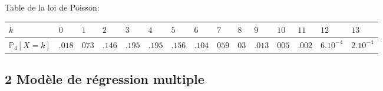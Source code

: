 \documentclass[a4paper,10pt]{article}
\begin{document}
Table de la loi de Poisson:
\begin{center}
\begin{tabular}{|l|l|l|l|l|l|l|l|l|l|l|l|l|l|l|}
\hline
\multicolumn{1}{|l|}{$k$}&	\multicolumn{1}{|l|}{ $0$}&	\multicolumn{1}{|l|}{ $1$}&	\multicolumn{1}{|l|}{ $2$}&	\multicolumn{1}{|l|}{ $3$}&	\multicolumn{1}{|l|}{ $4$}&	\multicolumn{1}{|l|}{ $5$}&	\multicolumn{1}{|l|}{ $6$}&	\multicolumn{1}{|l|}{ $7$}&	\multicolumn{1}{|l|}{ $8$}&	\multicolumn{1}{|l|}{ $9$}&	\multicolumn{1}{|l|}{ $10$}&	\multicolumn{1}{|l|}{ $11$}&	\multicolumn{1}{|l|}{ $12$}&	\multicolumn{1}{|l|}{ $13$}	\\
\hline
\multicolumn{1}{|l|}{ $\mathbb{P}_{4}[X=k]$}&	\multicolumn{1}{|l|}{ $.018$}&	\multicolumn{1}{|l|}{ $073$}&	\multicolumn{1}{|l|}{ $.146$}&	\multicolumn{1}{|l|}{ $.195$}&	\multicolumn{1}{|l|}{ $.195$}&	\multicolumn{1}{|l|}{ $.156$}&	\multicolumn{1}{|l|}{ $.104$}&	\multicolumn{1}{|l|}{ $059$}&	\multicolumn{1}{|l|}{ $03$}&	\multicolumn{1}{|l|}{ $.013$}&	\multicolumn{1}{|l|}{ $005$}&	\multicolumn{1}{|l|}{ $.002$}&	\multicolumn{1}{|l|}{ $6.10^{-4}$}&	\multicolumn{1}{|l|}{ $2.10^{-4}$}	\\
\hline
\end{tabular}

\end{center}
\subsection*{2 Mod\`{e}le de r\'{e}gression multiple}
\end{document}
